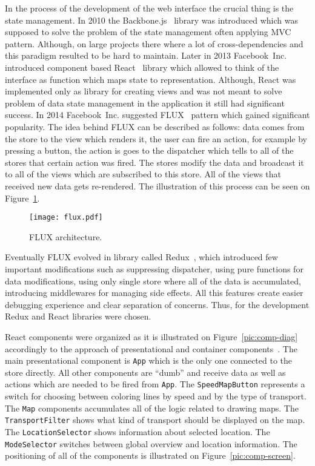 In the process of the development of the web interface the crucial thing is the state management. In
2010 the Backbone.js~\cite{backbone} library was introduced which was supposed to solve the problem
of the state management often applying MVC~\cite{backbone:mvc} pattern. Although, on large projects
there where a lot of cross-dependencies and this paradigm resulted to be hard to maintain. Later in
2013 Facebook~Inc. introduced component based React~\cite{react} library which allowed to think of
the interface as function which maps state to representation. Although, React was implemented only
as library for creating views and was not meant to solve problem of data state management in the
application it still had significant success. In 2014 Facebook~Inc. suggested FLUX~\cite{flux}
pattern which gained significant popularity. The idea behind FLUX can be described as follows: data
comes from the store to the view which renders it, the user can fire an action, for example by
pressing a button, the action is goes to the dispatcher which tells to all of the stores that
certain action was fired. The stores modify the data and broadcast it to all of the views which are
subscribed to this store. All of the views that received new data gets re-rendered. The illustration
of this process can be seen on Figure~\ref{pic:flux}.

\begin{figure}[h]
  \centering
  \texttt{[image: flux.pdf]}
  \caption{FLUX architecture.}
  \label{pic:flux}
\end{figure}

Eventually FLUX evolved in library called Redux~\cite{redux}, which introduced few important
modifications such as suppressing dispatcher, using pure functions for data modifications, using
only single store where all of the data is accumulated, introducing middlewares for managing
side effects. All this features create easier debugging experience and clear separation
of concerns. Thus, for the development Redux and React libraries were chosen.

React components were organized as it is illustrated on Figure~\ref{pic:comp-diag} accordingly to
the approach of presentational and container components~\cite{redux:ppc}. The main presentational
component is \texttt{App} which is the only one connected to the store directly. All other
components are ``dumb'' and receive data as well as actions which are
needed to be fired from \texttt{App}. The \texttt{SpeedMapButton} represents a switch for choosing
between coloring lines by speed and by the type of transport. The \texttt{Map} components
accumulates all of the logic related to drawing maps. The \texttt{TransportFilter} shows
what kind of transport should be displayed on the map. The \texttt{LocationSelector}
shows information about selected location. The \texttt{ModeSelector} switches between
global overview and location information. The positioning of all of the components is illustrated
on Figure~\ref{pic:comp-screen}.



